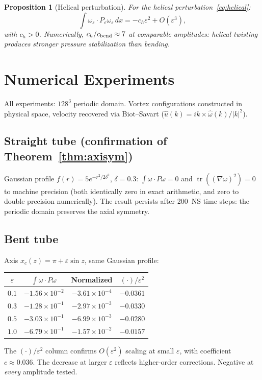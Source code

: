 \documentclass[11pt,a4paper]{article}
\theoremstyle{plain}
\newtheorem{proposition}[theorem]{Proposition}
\theoremstyle{definition}
\theoremstyle{remark}
\DeclareMathOperator{\tr}{tr}
\begin{document}
\begin{proposition}[Helical perturbation]
\label{prop:helical}
For the helical
perturbation~\eqref{eq:helical}:
\begin{equation}
\int\omega_\varepsilon\cdot P_\varepsilon
\omega_\varepsilon\,dx
= -c_h\varepsilon^2 + O(\varepsilon^3),
\end{equation}
with $c_h>0$.  Numerically,
$c_h/c_{\rm bend}\approx 7$ at comparable
amplitudes: helical twisting produces
stronger pressure stabilization than bending.
\end{proposition}


\section{Numerical Experiments}\label{sec:numerics}

All experiments: $128^3$ periodic domain.
Vortex configurations constructed in physical
space, velocity recovered via Biot--Savart
($\hat u(k) = ik\times\hat\omega(k)/|k|^2$).

\subsection{Straight tube (confirmation of
Theorem~\ref{thm:axisym})}

Gaussian profile $f(r)=5e^{-r^2/2\delta^2}$,
$\delta=0.3$:
$\int\omega\cdot P\omega = 0$ and
$\tr((\nabla\omega)^2) = 0$ to machine precision
(both identically zero in exact arithmetic, and
zero to double precision numerically).  The result
persists after 200~NS time steps: the periodic
domain preserves the axial symmetry.

\subsection{Bent tube}

Axis $x_c(z) = \pi+\varepsilon\sin z$, same
Gaussian profile:
\begin{center}
\renewcommand{\arraystretch}{1.2}
\begin{tabular}{@{}cccc@{}}
\toprule
$\varepsilon$ & $\int\omega\cdot P\omega$
  & Normalized & $(\cdot)/\varepsilon^2$ \\
\midrule
$0.1$ & $-1.56\!\times\!10^{-2}$ & $-3.61\!\times\!10^{-4}$ & $-0.0361$ \\
$0.3$ & $-1.28\!\times\!10^{-1}$ & $-2.97\!\times\!10^{-3}$ & $-0.0330$ \\
$0.5$ & $-3.03\!\times\!10^{-1}$ & $-6.99\!\times\!10^{-3}$ & $-0.0280$ \\
$1.0$ & $-6.79\!\times\!10^{-1}$ & $-1.57\!\times\!10^{-2}$ & $-0.0157$ \\
\bottomrule
\end{tabular}
\end{center}
The $(\cdot)/\varepsilon^2$ column confirms
$O(\varepsilon^2)$ scaling at small $\varepsilon$,
with coefficient $c\approx 0.036$.  The decrease
at larger $\varepsilon$ reflects higher-order
corrections.
Negative at \emph{every} amplitude tested.
\end{document}

